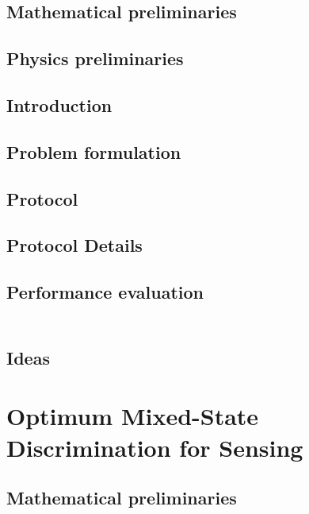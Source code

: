 \documentclass[../../note.tex]{subfiles}
\begin{document}
\subsection{Mathematical preliminaries}


\subsection{Physics preliminaries}


\subsection{Introduction}


\subsection{Problem formulation}


\subsection{Protocol}


\subsection{Protocol Details}


\subsection{Performance evaluation}

\begin{lemma}
    \begin{align}
    \end{align}
\end{lemma}

\subsection{Ideas}

\section{Optimum Mixed-State Discrimination for Sensing \cite{zhuang2017optimum}}
\subsection{Mathematical preliminaries}
\end{document}
